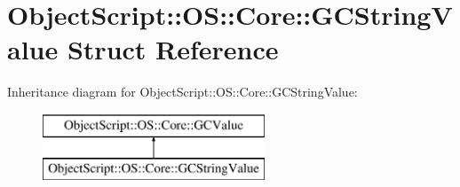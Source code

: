 \hypertarget{struct_object_script_1_1_o_s_1_1_core_1_1_g_c_string_value}{}\section{Object\+Script\+:\+:OS\+:\+:Core\+:\+:G\+C\+String\+Value Struct Reference}
\label{struct_object_script_1_1_o_s_1_1_core_1_1_g_c_string_value}
Inheritance diagram for Object\+Script\+:\+:OS\+:\+:Core\+:\+:G\+C\+String\+Value\+:\begin{figure}[H]
\begin{center}
\leavevmode
\includegraphics[height=2.000000cm]{struct_object_script_1_1_o_s_1_1_core_1_1_g_c_string_value}
\end{center}
\end{figure}

